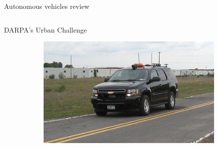 \begin{frame}{Autonomous vehicles review}
\begin{columns}[T]
\begin{center}
\begin{overlayarea}{\textwidth}{\textheight}
{\begin{block}{DARPA's Urban Challenge}
\begin{figure}[t]
\begin{subfigure}[b]{0.4\textwidth}
		      \includegraphics[width=\textwidth]{skynet}
		    \end{subfigure}

	    \end{figure}
	  \end{block}
	  }
	\end{overlayarea}
      \end{center}
    \end{columns}
    

\end{frame}
